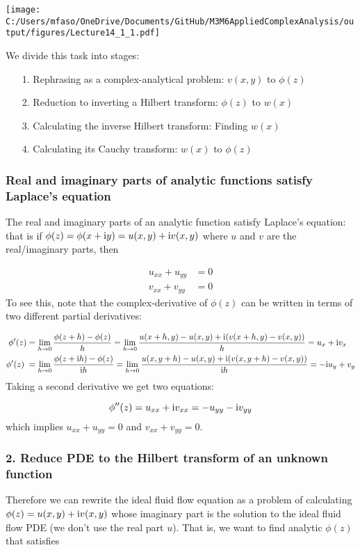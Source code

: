 \documentclass[12pt,a4paper]{article}
\def\I{ {\rm i} }
\def\addtab#1={#1\;&=}
\def\ccr{\\\addtab}
\def\addtab#1={#1\;&=}
\def\ccr{\\\addtab}
\begin{document}
\texttt{[image: C:/Users/mfaso/OneDrive/Documents/GitHub/M3M6AppliedComplexAnalysis/output/figures/Lecture14\_1\_1.pdf]}

We divide this task into stages:

\begin{itemize}
\item[1. ] Rephrasing as a complex-analytical problem: $v(x,y)$ to $\phi(z)$


\item[2. ] Reduction to inverting a Hilbert transform: $\phi(z)$ to $w(x)$


\item[3. ] Calculating the inverse Hilbert transform: Finding $w(x)$


\item[4. ] Calculating its Cauchy transform: $w(x)$ to $\phi(z)$

\end{itemize}
\subsubsection{Real and imaginary parts of analytic functions satisfy Laplace's equation}
The real and imaginary parts of an analytic function satisfy Laplace's equation: that is  if $\phi(z) = \phi(x + \I y) = u(x,y) + \I v(x,y)$ where $u$ and $v$ are the real/imaginary parts, then


\begin{align*}
 u_{xx} + u_{yy}&= 0 \\
 v_{xx} + v_{yy} &= 0
\end{align*}
To see this, note that the complex-derivative of $\phi(z)$ can be written in terms of two different partial derivatives:


\begin{align*}
    \phi'(z) &= \lim_{h \rightarrow 0} {\phi(z+h) - \phi(z) \over h} = \lim_{h \rightarrow 0} {u(x+h,y)-u(x,y) + \I (v(x+h,y)-v(x,y)) \over h} = u_x + \I v_x \ccr
    \phi'(z) = \lim_{h \rightarrow 0} {\phi(z+\I h) - \phi(z) \over \I h} = \lim_{h \rightarrow 0} {u(x,y+h)-u(x,y) + \I (v(x,y+h)-v(x,y)) \over \I h} = - \I u_y + v_y
\end{align*}
Taking a second derivative we get two equations:

\[
    \phi''(z) = u_{xx} + \I v_{xx} = -u_{yy} -\I v_{yy}
\]
which implies $u_{xx} + u_{yy} = 0$ and $v_{xx} + v_{yy} = 0$.

\subsubsection{2. Reduce PDE to the Hilbert transform of an unknown function}
Therefore we can rewrite the ideal fluid flow equation as a problem of calculating $\phi(z) = u(x,y) + \I v(x,y)$ whose imaginary part is the solution to the ideal fluid flow PDE (we don't use the real part $u$). That is, we want to find analytic $\phi(z)$ that satisfies
\end{document}
